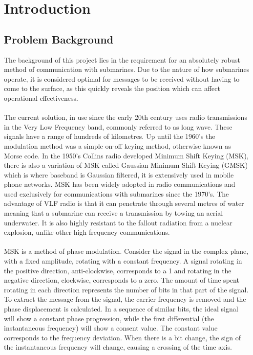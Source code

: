 \chapter{Introduction}
\section{Problem Background}
The background of this project lies in the requirement for an absolutely robust method of communication with submarines. Due to the nature of how submarines operate, it is considered optimal for messages to be received without having to come to the surface, as this quickly reveals the position which can affect operational effectiveness. 
\\\\
The current solution, in use since the early 20th century uses radio transmissions in the Very Low Frequency band, commonly referred to as long wave. These signals have a range of hundreds of kilometres. Up until the 1960’s the modulation method was a simple on-off keying method, otherwise known as Morse code. In the 1950’s Collins radio developed Minimum Shift Keying (MSK), there is also a variation of MSK called Gaussian Minimum Shift Keying (GMSK) which is where baseband is Gaussian filtered, it is extensively used in mobile phone networks. MSK has been widely adopted in radio communications and used exclusively for communications with submarines since the 1970’s. The advantage of VLF radio is that it can penetrate through several metres of water meaning that a submarine can receive a transmission by towing an aerial underwater. It is also highly resistant to the fallout radiation from a nuclear explosion, unlike other high frequency communications.  
\\\\
MSK is a method of phase modulation. Consider the signal in the complex plane, with a fixed amplitude, rotating with a constant frequency. A signal rotating in the positive direction, anti-clockwise, corresponds to a 1 and rotating in the negative direction, clockwise, corresponds to a zero. The amount of time spent rotating in each direction represents the number of bits in that part of the signal. To extract the message from the signal, the carrier frequency is removed and the phase displacement is calculated.  In a sequence of similar bits, the ideal signal will show a constant phase progression, while the first differential (the instantaneous frequency) will show a consent value. The constant value corresponds to the frequency deviation. When there is a bit change, the sign of the instantaneous frequency will change, causing a crossing of the time axis.

